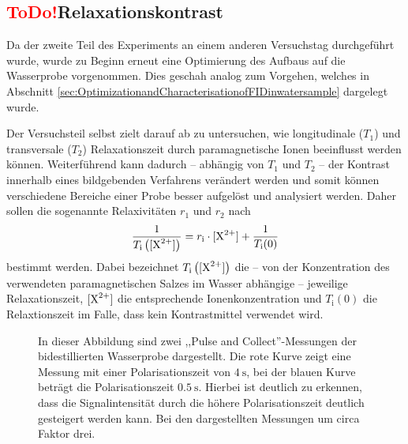 \subsection{\textcolor{red}{ToDo!}Relaxationskontrast}
\label{sec:Signalintensitaet}
Da der zweite Teil des Experiments an einem anderen Versuchstag durchgeführt wurde, wurde zu Beginn erneut eine Optimierung des Aufbaus auf die Wasserprobe vorgenommen. Dies geschah analog zum Vorgehen, welches in Abschnitt \ref{sec:OptimizationandCharacterisationofFIDinwatersample} dargelegt wurde.

Der Versuchsteil selbst zielt darauf ab zu untersuchen, wie longitudinale ($T_1$) und transversale ($T_2$) Relaxationszeit durch paramagnetische Ionen beeinflusst werden können. 
Weiterführend kann dadurch -- abhängig von $T_1$ und $T_2$ -- der Kontrast innerhalb eines bildgebenden Verfahrens verändert werden und somit können verschiedene Bereiche einer Probe besser aufgelöst und analysiert werden. 
Daher sollen die sogenannte Relaxivitäten $r_1$ und $r_2$ nach
\begin{align}
    \frac{1}{T_{\text{i}}\left([\ce{X^2+}]\right)} = r_{\text{i}} \cdot [\ce{X^2+}] + \frac{1}{T_{\text{i}}(0)}
\end{align}
bestimmt werden. Dabei bezeichnet $T_{\text{i}}\left([\ce{X^2+}]\right)$ die -- von der Konzentration des verwendeten paramagnetischen Salzes im Wasser abhängige -- jeweilige Relaxationszeit, $[\ce{X^2+}]$  die entsprechende Ionenkonzentration und $T_{\text{i}}(0)$ die Relaxtionszeit im Falle, dass kein Kontrastmittel verwendet wird.




\begin{figure}[H]
    \centering
    
    \caption[Abhängigkeit der Signalintensität von der Polarisationszeit.]{In dieser Abbildung sind zwei ,,Pulse and Collect''-Messungen der bidestillierten Wasserprobe dargestellt. Die rote Kurve zeigt eine Messung mit einer Polarisationszeit von $\SI{4}{\second}$, bei der blauen Kurve beträgt die Polarisationszeit $\SI{0.5}{\second}$. Hierbei ist deutlich zu erkennen, dass die Signalintensität durch die höhere Polarisationszeit deutlich gesteigert werden kann. Bei den dargestellten Messungen um circa Faktor drei.} 
    \label{fig:SignalintensitaetPolarisationszeit}    
\end{figure}







